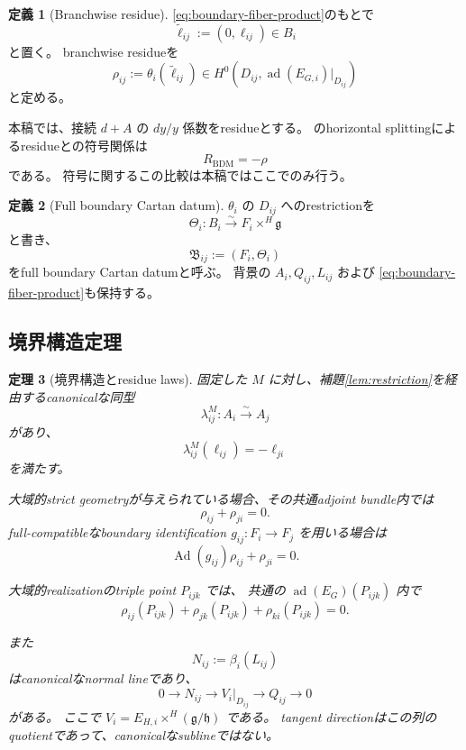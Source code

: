 \documentclass[uplatex,dvipdfmx,11pt]{jsarticle}
\numberwithin{equation}{section}
\theoremstyle{plain}
\newtheorem{theorem}{定理}[section]
\theoremstyle{definition}
\newtheorem{definition}[theorem]{定義}
\theoremstyle{remark}
\DeclareMathOperator{\ad}{ad}
\DeclareMathOperator{\Ad}{Ad}
\newcommand{\g}{\mathfrak g}
\newcommand{\h}{\mathfrak h}
\newcommand{\calB}{\mathfrak B}
\begin{document}
\begin{definition}[Branchwise residue]
\label{def:residue}
\eqref{eq:boundary-fiber-product}のもとで
\[
\widetilde\ell_{ij}:=(0,\ell_{ij})\in B_i
\]
と置く。
branchwise residueを
\begin{equation}
\label{eq:residue-definition}
\rho_{ij}:=\theta_i(\widetilde\ell_{ij})
\in H^0(D_{ij},\ad(E_{G,i})|_{D_{ij}})
\end{equation}
と定める。

本稿では、接続 \(d+A\) の \(dy/y\) 係数をresidueとする。
\cite{BDM}のhorizontal splittingによるresidueとの符号関係は
\[
R_{\mathrm{BDM}}=-\rho
\]
である。
符号に関するこの比較は本稿ではここでのみ行う。
\end{definition}

\begin{definition}[Full boundary Cartan datum]
\label{def:full-boundary-datum}
\(\theta_i\) の \(D_{ij}\) へのrestrictionを
\[
\Theta_i:B_i\xrightarrow{\sim}F_i\times^H\g
\]
と書き、
\[
\calB_{ij}:=(F_i,\Theta_i)
\]
をfull boundary Cartan datumと呼ぶ。
背景の \(A_i,Q_{ij},L_{ij}\) および
\eqref{eq:boundary-fiber-product}も保持する。
\end{definition}

\subsection{境界構造定理}

\begin{theorem}[境界構造とresidue laws]
\label{thm:boundary-structure}
固定した \(M\) に対し、補題\ref{lem:restriction}を経由するcanonicalな同型
\[
\lambda^M_{ij}:A_i\xrightarrow{\sim}A_j
\]
があり、
\begin{equation}
\label{eq:normal-sign}
\lambda^M_{ij}(\ell_{ij})=-\ell_{ji}
\end{equation}
を満たす。

大域的strict geometryが与えられている場合、その共通adjoint bundle内では
\begin{equation}
\label{eq:residue-antisymmetry}
\rho_{ij}+\rho_{ji}=0.
\end{equation}
full-compatibleなboundary identification \(g_{ij}:F_i\to F_j\) を用いる場合は
\begin{equation}
\label{eq:residue-transport}
\Ad(g_{ij})\rho_{ij}+\rho_{ji}=0.
\end{equation}

大域的realizationのtriple point \(P_{ijk}\) では、
共通の \(\ad(E_G)(P_{ijk})\) 内で
\begin{equation}
\label{eq:triple-residue}
\rho_{ij}(P_{ijk})+\rho_{jk}(P_{ijk})+\rho_{ki}(P_{ijk})=0.
\end{equation}

また
\[
N_{ij}:=\beta_i(L_{ij})
\]
はcanonicalなnormal lineであり、
\begin{equation}
\label{eq:normal-quotient}
0\longrightarrow N_{ij}
\longrightarrow V_i|_{D_{ij}}
\longrightarrow Q_{ij}
\longrightarrow0
\end{equation}
がある。
ここで \(V_i=E_{H,i}\times^H(\g/\h)\) である。
tangent directionはこの列のquotientであって、canonicalなsublineではない。
\end{theorem}
\end{document}
